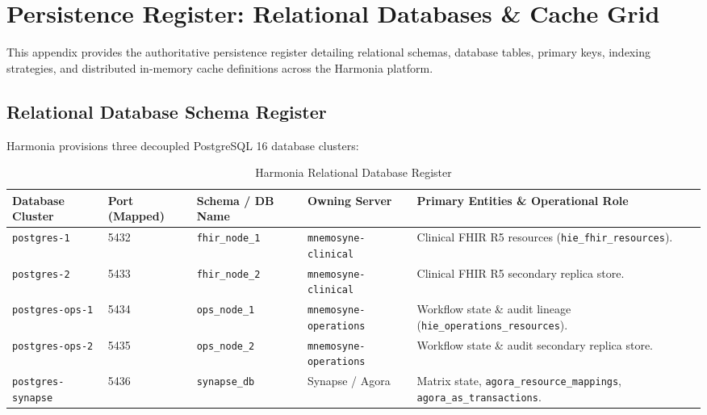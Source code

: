 
\chapter{Persistence Register: Relational Databases \& Cache Grid}
\label{app:persistence_register}

This appendix provides the authoritative persistence register detailing relational schemas, database tables, primary keys, indexing strategies, and distributed in-memory cache definitions across the Harmonia platform.

\section{Relational Database Schema Register}

Harmonia provisions three decoupled PostgreSQL 16 database clusters:

\begin{table}[htbp]
\centering
\scriptsize
\begin{tabularx}{\textwidth}{l P{2.5cm} P{3.0cm} P{2.8cm} Y}
\toprule
\textbf{Database Cluster} & \textbf{Port (Mapped)} & \textbf{Schema / DB Name} & \textbf{Owning Server} & \textbf{Primary Entities \& Operational Role} \\
\midrule
\nolinkurl{postgres-1} & 5432 & \nolinkurl{fhir_node_1} & \nolinkurl{mnemosyne-clinical} & Clinical FHIR R5 resources (\nolinkurl{hie_fhir_resources}). \\
\nolinkurl{postgres-2} & 5433 & \nolinkurl{fhir_node_2} & \nolinkurl{mnemosyne-clinical} & Clinical FHIR R5 secondary replica store. \\
\addlinespace
\nolinkurl{postgres-ops-1} & 5434 & \nolinkurl{ops_node_1} & \nolinkurl{mnemosyne-operations} & Workflow state \& audit lineage (\nolinkurl{hie_operations_resources}). \\
\nolinkurl{postgres-ops-2} & 5435 & \nolinkurl{ops_node_2} & \nolinkurl{mnemosyne-operations} & Workflow state \& audit secondary replica store. \\
\addlinespace
\nolinkurl{postgres-synapse} & 5436 & \nolinkurl{synapse_db} & Synapse / Agora & Matrix state, \nolinkurl{agora_resource_mappings}, \nolinkurl{agora_as_transactions}. \\
\bottomrule
\end{tabularx}
\caption{Harmonia Relational Database Register}
\label{tab:relational_database_register}
\end{table}

